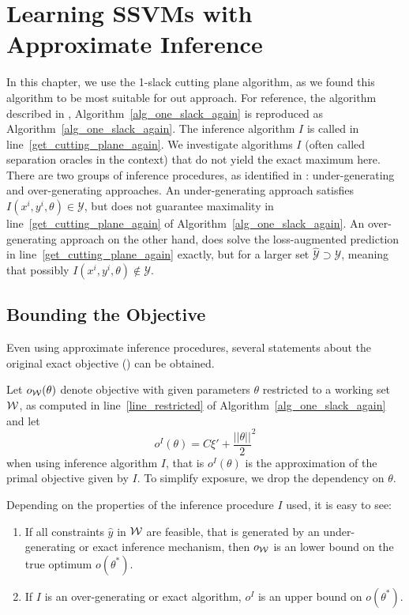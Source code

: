 \section{Learning SSVMs with Approximate Inference}
In this chapter, we use the 1-slack cutting plane algorithm, as we found this
algorithm to be most suitable for out approach. For reference, the algorithm described in
, Algorithm~\ref{alg_one_slack_again} is reproduced as
Algorithm~\ref{alg_one_slack_again}. The inference algorithm $I$ is called in
line~\ref{get_cutting_plane_again}. We investigate algorithms $I$ (often called
separation
oracles in the context) that do not yield the exact maximum here.
There are two groups of inference procedures, as identified in
\citet{finley2008training}: under-generating and over-generating approaches.
An under-generating approach satisfies $I(x^i, y^i, \theta) \in
\mathcal{Y}$, but does not guarantee maximality in line~\ref{get_cutting_plane_again}
of Algorithm~\ref{alg_one_slack_again}. An over-generating approach on the other
hand, does solve the loss-augmented prediction in line~\ref{get_cutting_plane_again}
exactly, but for a larger set $\hat{\mathcal{Y}} \supset \mathcal{Y}$, meaning
that possibly $I(x^i, y^i, \theta) \notin \mathcal{Y}$.

\subsection{Bounding the Objective}
Even using approximate inference procedures, several statements
about the original exact objective () can be
obtained.

Let $o_{\mathcal{W}}(\theta)$ denote objective  with
given parameters $\theta$ restricted to a working set $\mathcal{W}$, as computed in
line~\ref{line_restricted} of Algorithm~\ref{alg_one_slack_again} and  let
\[
    o^I(\theta) = C\xi' + \frac{||\theta||}{2}^2
\]
when using inference algorithm $I$, that is $o^I(\theta)$ is the approximation of the primal
objective given by $I$. To simplify exposure, we drop the dependency on $\theta$.

Depending on the properties of the inference procedure $I$ used, it is easy to see:
\begin{enumerate}
    \item If all constraints $\hat{y}$ in  $\mathcal{W}$ are feasible, that is generated
        by an under-generating or exact inference mechanism, then $o_{\mathcal{W}}$ is
        an lower bound on the true optimum $o(\theta^*)$.

    \item If $I$ is an over-generating or exact algorithm, $o^I$ is an upper
        bound on $o(\theta^*)$.
\end{enumerate}

